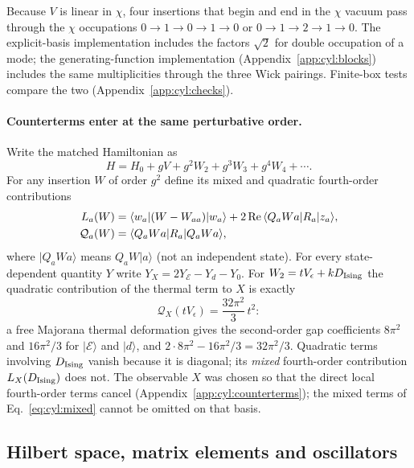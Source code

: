 \documentclass[11pt,a4paper]{article}
\numberwithin{equation}{section}
\newcommand{\ket}[1]{\lvert#1\rangle}
\begin{document}
Because $V$ is linear in $\chi$, four insertions that begin and end in the $\chi$ vacuum pass through the $\chi$
occupations $0\to1\to0\to1\to0$ or $0\to1\to2\to1\to0$. The explicit-basis implementation includes the factors
$\sqrt2$ for double occupation of a mode; the generating-function implementation (Appendix~\ref{app:cyl:blocks}) includes
the same multiplicities through the three Wick pairings. Finite-box tests compare the two
(Appendix~\ref{app:cyl:checks}).

\paragraph{Counterterms enter at the same perturbative order.} Write the matched Hamiltonian as
\begin{equation}
 H=H_0+gV+g^2W_2+g^3W_3+g^4W_4+\cdots.
\end{equation}
For any insertion $W$ of order $g^2$ define its mixed and quadratic fourth-order contributions
\begin{align}
 L_a(W)&=\langle w_a\rvert(W-W_{aa})\ket{w_a}+2\,{\rm Re}\,\langle Q_aWa\rvert R_a\ket{z_a},\notag\\
 \mathcal Q_a(W)&=\langle Q_aWa\rvert R_a\ket{Q_aWa},
 \label{eq:cyl:mixed}
\end{align}
where $\ket{Q_aWa}$ means $Q_aW\ket a$ (not an independent state). For every state-dependent quantity $Y$ write
$Y_X=2Y_{\mathcal E}-Y_d-Y_0$. For $W_2=tV_\epsilon+kD_{\rm Ising}$ the quadratic contribution of the thermal term to $X$
is exactly
\begin{equation}
 \mathcal Q_X(tV_\epsilon)=\frac{32\pi^2}{3}\,t^2:
 \label{eq:cyl:thermalsq}
\end{equation}
a free Majorana thermal deformation gives the second-order gap coefficients $8\pi^2$ and $16\pi^2/3$ for $\ket{\mathcal
E}$ and $\ket d$, and $2\cdot8\pi^2-16\pi^2/3=32\pi^2/3$. Quadratic terms involving $D_{\rm Ising}$ vanish because it is
diagonal; its \emph{mixed} fourth-order contribution $L_X(D_{\rm Ising})$ does not. The observable $X$ was chosen so
that the direct local fourth-order terms cancel (Appendix~\ref{app:cyl:counterterms}); the mixed terms of
Eq.~\eqref{eq:cyl:mixed} cannot be omitted on that basis.

\subsection{Hilbert space, matrix elements and oscillators}\label{app:cyl:hilbert}
\end{document}

